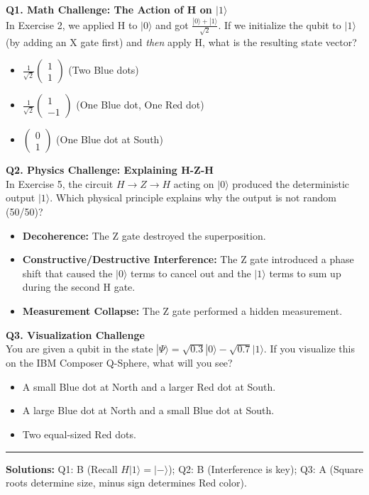 \documentclass[a4paper,11pt]{article}
\begin{document}
\vspace{0.5cm}

\textbf{Q1. Math Challenge: The Action of H on $|1\rangle$}\\
In Exercise 2, we applied H to $|0\rangle$ and got $\frac{|0\rangle + |1\rangle}{\sqrt{2}}$.
If we initialize the qubit to $|1\rangle$ (by adding an X gate first) and \textit{then} apply H, what is the resulting state vector?
\begin{itemize}
    \item[A)] $\frac{1}{\sqrt{2}} \begin{pmatrix} 1 \\ 1 \end{pmatrix}$ (Two Blue dots)
    \item[B)] $\frac{1}{\sqrt{2}} \begin{pmatrix} 1 \\ -1 \end{pmatrix}$ (One Blue dot, One Red dot)
    \item[C)] $\begin{pmatrix} 0 \\ 1 \end{pmatrix}$ (One Blue dot at South)
\end{itemize}

\vspace{0.4cm}

\textbf{Q2. Physics Challenge: Explaining H-Z-H}\\
In Exercise 5, the circuit $H \rightarrow Z \rightarrow H$ acting on $|0\rangle$ produced the deterministic output $|1\rangle$.
Which physical principle explains why the output is not random (50/50)?
\begin{itemize}
    \item[A)] \textbf{Decoherence:} The Z gate destroyed the superposition.
    \item[B)] \textbf{Constructive/Destructive Interference:} The Z gate introduced a phase shift that caused the $|0\rangle$ terms to cancel out and the $|1\rangle$ terms to sum up during the second H gate.
    \item[C)] \textbf{Measurement Collapse:} The Z gate performed a hidden measurement.
\end{itemize}

\vspace{0.4cm}

\textbf{Q3. Visualization Challenge}\\
You are given a qubit in the state $|\Psi\rangle = \sqrt{0.3}|0\rangle - \sqrt{0.7}|1\rangle$. 
If you visualize this on the IBM Composer Q-Sphere, what will you see?
\begin{itemize}
    \item[A)] A small Blue dot at North and a larger Red dot at South.
    \item[B)] A large Blue dot at North and a small Blue dot at South.
    \item[C)] Two equal-sized Red dots.
\end{itemize}

\vspace{1cm}
\hrule
\vspace{0.2cm}
\footnotesize{\textbf{Solutions:} Q1: B (Recall $H|1\rangle = |-\rangle$); Q2: B (Interference is key); Q3: A (Square roots determine size, minus sign determines Red color).}
\end{document}
